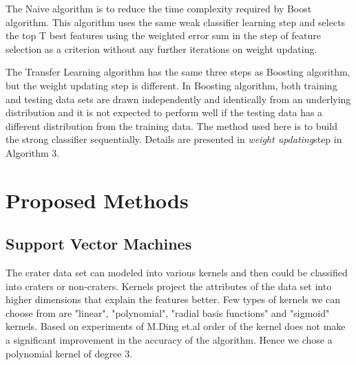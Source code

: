 \documentclass[conference]{IEEEtran}
\begin{document}
The Naive algorithm \cite{ding2011subkilometer} is to reduce the time complexity required by Boost algorithm. This algorithm uses the same weak classifier learning step and selects the top T best features using the weighted error sum in the step of feature selection as a criterion without any further iterations on weight updating.

The Transfer Learning algorithm has the same three steps as Boosting algorithm, but the weight updating step is different. In Boosting algorithm, both training and testing data sets are drawn independently and identically from an underlying distribution and it is not expected to perform well if the testing data has a different distribution from the training data. The method used here is to build the  strong classifier sequentially. Details are presented in {\it weight updating}step in Algorithm 3\cite{ding2011subkilometer}.






\section{Proposed Methods}

\subsection{Support Vector Machines}
The crater data set can modeled into various kernels and then could be classified into craters or non-craters. Kernels project the attributes of the data set into higher dimensions that explain the features better. Few types of kernels we can choose from are "linear", "polynomial", "radial basis functions" and "sigmoid" kernels. Based on experiments of M.Ding et.al \cite{Ding2013385} order of the kernel does not make a significant improvement in the accuracy of the algorithm. Hence we chose a polynomial kernel of degree 3.
\end{document}
